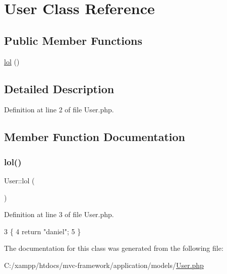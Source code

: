 \hypertarget{class_user}{}\section{User Class Reference}
\label{class_user}
\subsection*{Public Member Functions}
\begin{DoxyCompactItemize}
\item 
\hyperlink{class_user_a7c9ee2d0e167142f09bbe5319424eea4}{lol} ()
\end{DoxyCompactItemize}


\subsection{Detailed Description}


Definition at line 2 of file User.\+php.



\subsection{Member Function Documentation}
\hypertarget{class_user_a7c9ee2d0e167142f09bbe5319424eea4}{}\label{class_user_a7c9ee2d0e167142f09bbe5319424eea4} 
\subsubsection{\texorpdfstring{lol()}{lol()}}
{\footnotesize\ttfamily User\+::lol (\begin{DoxyParamCaption}{ }\end{DoxyParamCaption})}



Definition at line 3 of file User.\+php.


\begin{DoxyCode}
3                           \{
4         \textcolor{keywordflow}{return} \textcolor{stringliteral}{"daniel"};
5     \}
\end{DoxyCode}


The documentation for this class was generated from the following file\+:\begin{DoxyCompactItemize}
\item 
C\+:/xampp/htdocs/mvc-\/framework/application/models/\hyperlink{_user_8php}{User.\+php}\end{DoxyCompactItemize}
